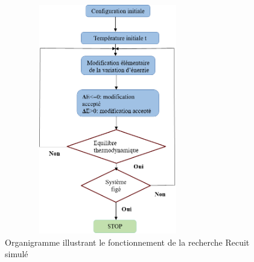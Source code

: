 \begin{enumerate}[label=\alph*)]
\begin{figure}[H]
	\centering
	\includegraphics[width=9cm,height=10cm]{Chap3/3.png}
	\caption{Organigramme  illustrant le fonctionnement  de la recherche Recuit simulé}
	\label{fig:CSF}
\end{figure}



\end{enumerate}
